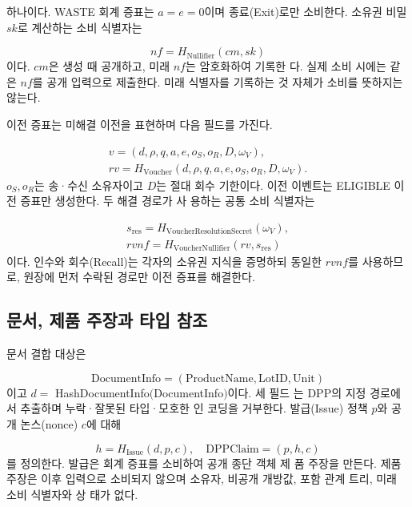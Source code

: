 하나이다. WASTE 회계 증표는 \(a=e=0\)이며 종료(Exit)로만
소비한다. 소유권 비밀 \(sk\)로 계산하는 소비 식별자는

\begin{equation}
    nf=H_{\mathrm{Nullifier}}(cm,sk)\tag{5}
\end{equation}
이다. \(cm\)은 생성 때 공개하고, 미래 \(nf\)는 암호화하여 기록한
다. 실제 소비 시에는 같은 \(nf\)를 공개 입력으로 제출한다. 미래
식별자를 기록하는 것 자체가 소비를 뜻하지는 않는다.

이전 증표는 미해결 이전을 표현하며 다음 필드를 가진다.

\begin{equation}
    \begin{gathered}v=(d,\rho,q,a,e,o_S,o_R,D,\omega_V),\\rv=H_{\mathrm{Voucher}}(d,\rho,q,a,e,o_S,o_R,D,\omega_V).\end{gathered}\tag{6}
\end{equation}
\(o_{S},o_{R}\)는 송·수신 소유자이고 \(D\)는 절대 회수 기한이다. 이전
이벤트는 ELIGIBLE 이전 증표만 생성한다. 두 해결 경로가 사
용하는 공통 소비 식별자는

\begin{equation}
    \begin{gathered}s_{\mathrm{res}}=H_{\mathrm{VoucherResolutionSecret}}(\omega_V),\\rvnf=H_{\mathrm{VoucherNullifier}}(rv,s_{\mathrm{res}})\end{gathered}\tag{7}
\end{equation}
이다. 인수와 회수(Recall)는 각자의 소유권 지식을 증명하되
동일한 \(rvnf\)를 사용하므로, 원장에 먼저 수락된 경로만 이전
증표를 해결한다.

\subsection{문서, 제품 주장과 타입 참조}
문서 결합 대상은

\begin{equation}
    \mathrm{DocumentInfo}=(\mathrm{ProductName},\mathrm{LotID},\mathrm{Unit})\tag{8}
\end{equation}
이고 \(d=\) HashDocumentInfo\((\)DocumentInfo\()\)이다. 세 필드
는 DPP의 지정 경로에서 추출하며 누락·잘못된 타입·모호한 인
코딩을 거부한다. 발급(Issue) 정책 \(p\)와 공개 논스(nonce) \(c\)에
대해

\begin{equation}
    h=H_{\mathrm{Issue}}(d,p,c),\quad\mathrm{DPPClaim}=(p,h,c)\tag{9}
\end{equation}
를 정의한다. 발급은 회계 증표를 소비하여 공개 종단 객체 제
품 주장을 만든다. 제품 주장은 이후 입력으로 소비되지 않으며
소유자, 비공개 개방값, 포함 관계 트리, 미래 소비 식별자와 상
태가 없다.

